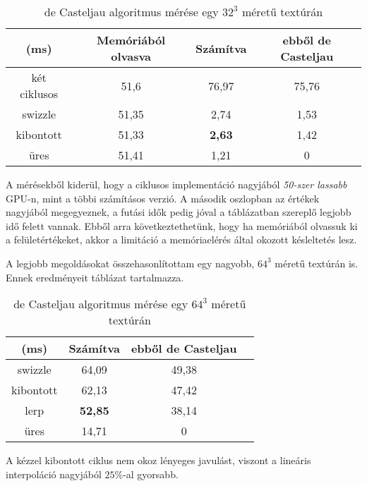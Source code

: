 \begin{table}[H]
	\begin{center}
		\begin{tabular}{| c || c || c | c |}
			\hline
			(ms) & \textbf{Memóriából olvasva} & \textbf{Számítva} & \textbf{ebből de Casteljau} \\ 
			\hline\hline
			két ciklusos & 51,6 & 76,97	& 75,76 \\
			\hline
			swizzle	& 51,35	& 2,74 & 1,53 \\
			\hline
			kibontott & 51,33 & \textbf{2,63} & 1,42 \\
			\hline
			üres & 51,41 & 1,21	& 0 \\
			\hline
		\end{tabular}
	\end{center}
	\caption{de Casteljau algoritmus mérése egy $32^3$ méretű textúrán}
	\label{tab:deCasteljau}
\end{table}

A mérésekből kiderül, hogy a ciklusos implementáció nagyjából \emph{50-szer lassabb} GPU-n, mint a többi számításos verzió. A második oszlopban az értékek nagyjából megegyeznek, a futási idők pedig jóval a táblázatban szereplő legjobb idő felett vannak. Ebből arra következtethetünk, hogy ha memóriából olvassuk ki a felületértékeket, akkor a limitáció a memóriaelérés által okozott késleltetés lesz.

A legjobb megoldásokat összehasonlítottam egy nagyobb, $64^3$ méretű textúrán is. Ennek eredményeit  táblázat tartalmazza.

\begin{table}[H]
	\begin{center}
		\begin{tabular}{| c || c || c | c |}
			\hline
			(ms) & \textbf{Számítva} & \textbf{ebből de Casteljau} \\ 
			\hline\hline
			swizzle & 64,09 & 49,38 \\
			\hline
			kibontott & 62,13 & 47,42 \\
			\hline
			lerp & \textbf{52,85} & 38,14 \\
			\hline
			üres & 14,71 & 0 \\
			\hline
		\end{tabular}
	\end{center}
	\caption{de Casteljau algoritmus mérése egy $64^3$ méretű textúrán}
	\label{tab:deCasteljau2}
\end{table}

A kézzel kibontott ciklus nem okoz lényeges javulást, viszont a lineáris interpoláció nagyjából $25\%$-al gyorsabb. 


